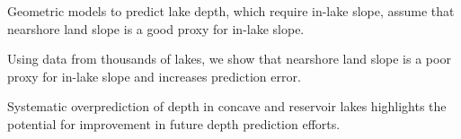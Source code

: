 \documentclass[draft]{agujournal2019}
\begin{document}




\begin{keypoints}
\item Geometric models to predict lake depth, which require in-lake slope, assume that nearshore land slope is a good proxy for in-lake slope.
\item Using data from thousands of lakes, we show that nearshore land slope is a poor proxy for in-lake slope and increases prediction error.
\item Systematic overprediction of depth in concave and reservoir lakes highlights the potential for improvement in future depth prediction efforts.
\end{keypoints}

%
%
\end{document}
